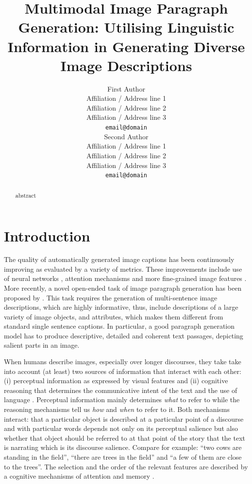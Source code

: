 \documentclass[11pt,a4paper]{article}
\title{Multimodal Image Paragraph Generation: Utilising Linguistic Information in Generating Diverse Image Descriptions}
\author{First Author \\
 Affiliation / Address line 1 \\
 Affiliation / Address line 2 \\
 Affiliation / Address line 3 \\
 \texttt{email@domain} \\\And
 Second Author \\
 Affiliation / Address line 1 \\
 Affiliation / Address line 2 \\
 Affiliation / Address line 3 \\
 \texttt{email@domain} \\}
\date{}
\begin{document}
\maketitle
\begin{abstract}
abstract

\end{abstract}

\section{Introduction}\label{sec:introduction}

The quality of automatically generated image captions \cite{bernardi2016automatic} has been continuously improving as evaluated by a variety of metrics.
These improvements include use of neural networks \cite{kiros14,vinyals2014tell}, attention mechanisms \cite{xu2015attend,Lu2016} and more fine-grained image features \cite{anderson2017bottomup}.
More recently, a novel open-ended task of image paragraph generation has been proposed by .
This task requires the generation of multi-sentence image descriptions, which are highly informative, thus, include descriptions of a large variety of image objects, and attributes, which makes them different from standard single sentence captions.
In particular, a good paragraph generation model has to produce descriptive, detailed and coherent text passages, depicting salient parts in an image.

When humans describe images, especially over longer discourses, they take take into account (at least) two sources of information that interact with each other: (i) perceptual information as expressed by visual features and (ii) cognitive reasoning that determines the communicative intent of the text and the use of language \cite{Kelleher:2020aa}.
Perceptual information mainly determines \emph{what} to refer to while the reasoning mechanisms tell us \emph{how} and \emph{when} to refer to it.
Both mechanisms interact: that a particular object is described at a particular point of a discourse and with particular words depends not only on its perceptual salience but also whether that object should be referred to at that point of the story that the text is narrating which is its discourse salience.
Compare for example: ``two cows are standing in the field'', ``there are trees in the field'' and ``a few of them are close to the trees''.
The selection and the order of the relevant features are described by a cognitive mechanisms of attention and memory \cite{Lavie:2004aa,Dobnik:2016ac}.
\end{document}
